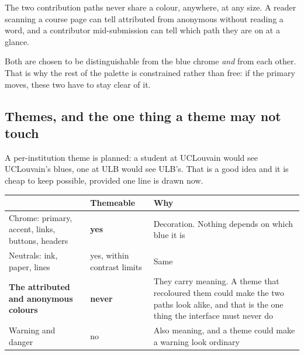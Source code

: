 \documentclass[11pt,a4paper]{article}
\begin{document}
\begin{center}
\end{center}

The two contribution paths never share a colour, anywhere, at any size. A reader
scanning a course page can tell attributed from anonymous without reading a
word, and a contributor mid-submission can tell which path they are on at a
glance.

Both are chosen to be distinguishable from the blue chrome \emph{and} from each
other. That is why the rest of the palette is constrained rather than free: if
the primary moves, these two have to stay clear of it.

\subsection{Themes, and the one thing a theme may not touch}

A per-institution theme is planned: a student at UCLouvain would see UCLouvain's
blues, one at ULB would see ULB's. That is a good idea and it is cheap to keep
possible, provided one line is drawn now.

\begin{center}
\sffamily\small
\begin{tabular}{@{}p{4.6cm}p{4.4cm}p{5.0cm}@{}}
\toprule
& \textbf{Themeable} & \textbf{Why} \\
\midrule
Chrome: primary, accent, links, buttons, headers & \textbf{yes} & Decoration. Nothing depends on which blue it is \\[1.5mm]
Neutrals: ink, paper, lines & yes, within contrast limits & Same \\[1.5mm]
\textbf{The attributed and anonymous colours} & \textbf{never} & They carry meaning. A theme that recoloured them could make the two paths look alike, and that is the one thing the interface must never do \\[1.5mm]
Warning and danger & no & Also meaning, and a theme could make a warning look ordinary \\
\bottomrule
\end{tabular}
\end{center}
\end{document}
